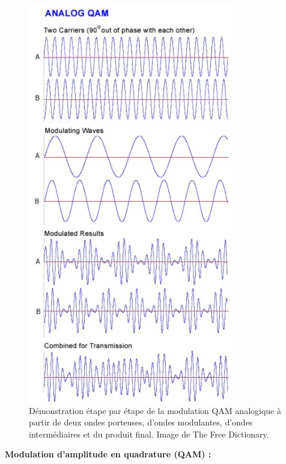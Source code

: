 \begin{figure}[H] %
    \centering
    \includegraphics[width=0.8\textwidth]{figures/6-44.jpg}
    \caption{Démonstration étape par étape de la modulation QAM analogique à partir de deux ondes porteuses, d'ondes modulantes, d'ondes intermédiaires et du produit final. Image de The Free Dictionary.}
    \label{fig:communication2}
\end{figure}
\textbf{Modulation d'amplitude en quadrature (QAM) :}
